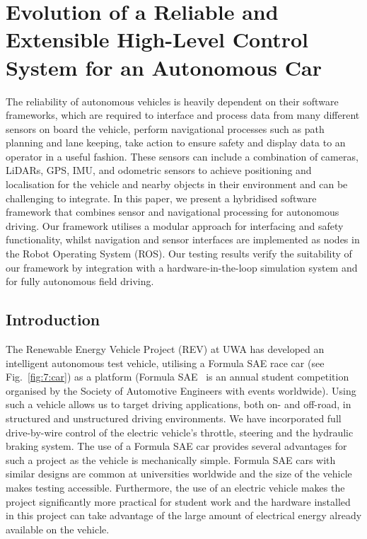 
\chapter[Evolution of a Reliable and Extensible High-Level Control System]{Evolution of a Reliable and Extensible High-Level Control System for an Autonomous Car}
\label{ch:evo}

\ifpdf
	\graphicspath{{Chapter7/Figs/Raster/}{Chapter7/Figs/PDF/}{Chapter7/Figs/}}
\else
	\graphicspath{{Chapter7/Figs/Vector/}{Chapter7/Figs/}}
\fi

The reliability of autonomous vehicles is heavily dependent on their software frameworks, which are required to interface and process data from many different sensors on board the vehicle, perform navigational processes such as path planning and lane keeping, take action to ensure safety and display data to an operator in a useful fashion. These sensors can include a combination of cameras, LiDARs, GPS, IMU, and odometric sensors to achieve positioning and localisation for the vehicle and nearby objects in their environment and can be challenging to integrate. In this paper, we present a hybridised software framework that combines sensor and navigational processing for autonomous driving. Our framework utilises a modular approach for interfacing and safety functionality, whilst navigation and sensor interfaces are implemented as nodes in the Robot Operating System (ROS). Our testing results verify the suitability of our framework by integration with a hardware-in-the-loop simulation system and for fully autonomous field driving.

\section{Introduction}
The Renewable Energy Vehicle Project (REV) at UWA has developed an intelligent autonomous test vehicle, utilising a Formula SAE race car (see Fig.~\ref{fig:7:car}) as a platform (Formula SAE~\cite{sae_international_student_nodate} is an annual student competition organised by the Society of Automotive Engineers with events worldwide). Using such a vehicle allows us to target driving applications, both on- and off-road, in structured and unstructured driving environments. We have incorporated full drive-by-wire control of the electric vehicle's throttle, steering and the hydraulic braking system. The use of a Formula SAE car provides several advantages for such a project as the vehicle is mechanically simple. Formula SAE cars with similar designs are common at universities worldwide and the size of the vehicle makes testing accessible. Furthermore, the use of an electric vehicle makes the project significantly more practical for student work and the hardware installed in this project can take advantage of the large amount of electrical energy already available on the vehicle.

